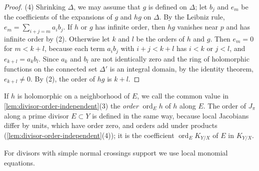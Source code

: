 \begin{proof}
(4) Shrinking $\Delta$, we may assume that $g$ is defined on $\Delta$; let $b_j$ and $e_m$ be the coefficients of the expansions of $g$ and $hg$ on $\Delta$. By the Leibniz rule, $e_m=\sum_{i+j=m}a_ib_j$. If $h$ or $g$ has infinite order, then $hg$ vanishes near $p$ and has infinite order by (2). Otherwise let $k$ and $l$ be the orders of $h$ and $g$. Then $e_m=0$ for $m<k+l$, because each term $a_ib_j$ with $i+j<k+l$ has $i<k$ or $j<l$, and $e_{k+l}=a_kb_l$. Since $a_k$ and $b_l$ are not identically zero and the ring of holomorphic functions on the connected set $\Delta'$ is an integral domain, by the identity theorem, $e_{k+l}\neq0$. By (2), the order of $hg$ is $k+l$.
\end{proof}

If $h$ is holomorphic on a neighborhood of $E$, we call the common value in \cref{lem:divisor-order-independent}(3) the \emph{order} $\operatorname{ord}_Eh$ of $h$ along $E$. The order of $J_\pi$ along a prime divisor $E\subset Y$ is defined in the same way, because local Jacobians differ by units, which have order zero, and orders add under products (\cref{lem:divisor-order-independent}(4)); it is the coefficient $\operatorname{ord}_EK_{Y/X}$ of $E$ in $K_{Y/X}$.

For divisors with simple normal crossings support we use local monomial equations.

